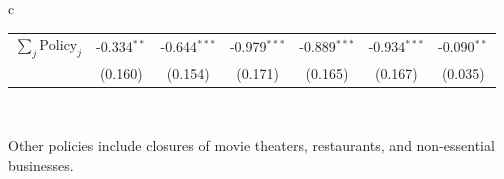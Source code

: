 \documentclass{beamer}
\def\bcolor{\color{forestgreen(web)}}
\def\pcolor{\color{blue}}
\renewcommand{\to}{{\rightarrow}}
\begin{document}
\begin{frame}
\begin{table}
\begin{minipage}{\linewidth}
\begin{tabular}{c}
\begin{tabular}{lccc|c|c|c}
$\sum_j \mathrm{Policy}_j$ & -0.334$^{**}$ & -0.644$^{***}$ & -0.979$^{***}$ & -0.889$^{***}$ & -0.934$^{***}$ & -0.090$^{**}$\\
 & (0.160) & (0.154) & (0.171) & (0.165) & (0.167) & (0.035)\\
\bottomrule
\end{tabular}
    \\
  \end{tabular}
  \end{minipage}
\end{table}
\begin{flushleft}
\footnotesize
Other policies include closures of movie theaters, restaurants, and non-essential businesses.
\end{flushleft}
\end{frame}
\end{document}
